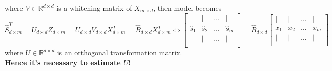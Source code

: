 \documentclass[a4 paper]{article}
\begin{document}
where $V\in\mathbb{R}^{d\times d}$ is a whitening matrix of $X_{m\times d}$, then model becomes
\begin{equation}
    \hat{S}^T_{d\times m}=U_{d\times d}Z_{d\times m}=U_{d\times d}V_{d\times d}X^T_{d\times m}=\hat{B}_{d\times d}X^T_{d\times m}\iff\begin{bmatrix}
| & | &  \hdots & | \\
\hat{s}_1 & \hat{s}_2 & \hdots & \hat{s}_m \\
| & | & \hdots & | \\
\end{bmatrix}=\hat{B}_{d\times d}
\begin{bmatrix}
| & | & \hdots & |\\
x_1 & x_2 & \hdots & x_m\\
| & | & \hdots & |\\
\end{bmatrix}%
\end{equation}
where $U\in\mathbb{R}^{d\times d}$ is an orthogonal transformation matrix.\\ \textbf{Hence it's necessary to estimate $U$!}
\end{document}
